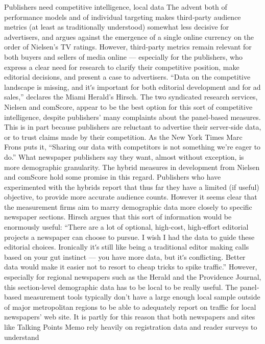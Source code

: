 Publishers need competitive intelligence, local data
The advent both of performance models and of individual targeting
makes third‐party audience metrics (at least as traditionally understood)
somewhat less decisive for advertisers, and argues against the emergence
of a single online currency on the order of Nielsen’s TV ratings.
However, third‐party metrics remain relevant for both buyers and sellers
of media online — especially for the publishers, who express a clear need
for research to clarify their competitive position, make editorial decisions,
and present a case to advertisers. ``Data on the competitive landscape is
missing, and itʹs important for both editorial development and for ad
sales,'' declares the Miami Herald’s Hirsch.
The two syndicated research services, Nielsen and comScore, appear to be
the best option for this sort of competitive intelligence, despite publishers’
many complaints about the panel‐based measures. This is in part because
publishers are reluctant to advertise their server‐side data, or to trust
claims made by their competition. As the New York Times Marc Frons puts
it, ``Sharing our data with competitors is not something we’re eager to
do.''
What newspaper publishers say they want, almost without exception, is
more demographic granularity. The hybrid measures in development
from Nielsen and comScore hold some promise in this regard. Publishers
who have experimented with the hybrids report that thus far they have a
limited (if useful) objective, to provide more accurate audience counts.
However it seems clear that the measurement firms aim to marry
demographic data more closely to specific newspaper sections. Hirsch
argues that this sort of information would be enormously useful:
``There are a lot of optional, high‐cost, high‐effort editorial projects
a newspaper can choose to pursue. I wish I had the data to guide
these editorial choices. Ironically itʹs still like being a traditional
editor making calls based on your gut instinct — you have more
data, but itʹs conflicting. Better data would make it easier not to
resort to cheap tricks to spike traffic.''
However, especially for regional newspapers such as the Herald and the
Providence Journal, this section‐level demographic data has to be local to be
really useful. The panel‐based measurement tools typically don’t have a
large enough local sample outside of major metropolitan regions to be
able to adequately report on traffic for local newspapers’ web site. It is
partly for this reason that both newspapers and sites like Talking Points
Memo rely heavily on registration data and reader surveys to understand
